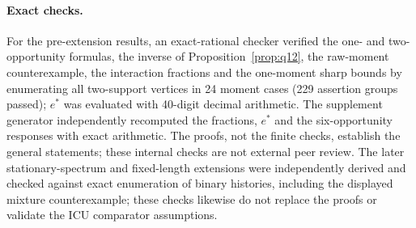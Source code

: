 \paragraph{Exact checks.} For the pre-extension results, an exact-rational checker verified the one- and
two-opportunity formulas, the inverse of Proposition~\ref{prop:q12}, the
raw-moment counterexample, the interaction fractions and the one-moment sharp
bounds by enumerating all two-support vertices in 24 moment cases (229 assertion
groups passed); $e^*$ was evaluated with 40-digit decimal arithmetic. The
supplement generator independently recomputed the fractions, $e^*$ and the
six-opportunity responses with exact arithmetic. The proofs, not the finite
checks, establish the general statements; these internal checks are not external
peer review. The later stationary-spectrum and fixed-length extensions were
independently derived and checked against exact enumeration of binary histories,
including the displayed mixture counterexample; these checks likewise do not
replace the proofs or validate the ICU comparator assumptions.

